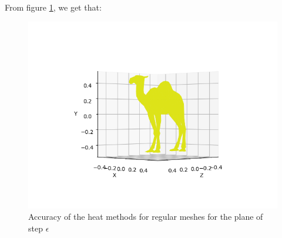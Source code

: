 \documentclass[math, info, english]{cours}
\begin{document}
From figure \ref{planediff}, we get that:
\begin{figure}[h]
	\centering
	\includegraphics{Figures/camel_t=1000_i=50_True.png}
	\caption{Accuracy of the heat methods for regular meshes for the plane of step $\epsilon$}
	\label{planediff}
\end{figure}

\appendix


\end{document}
